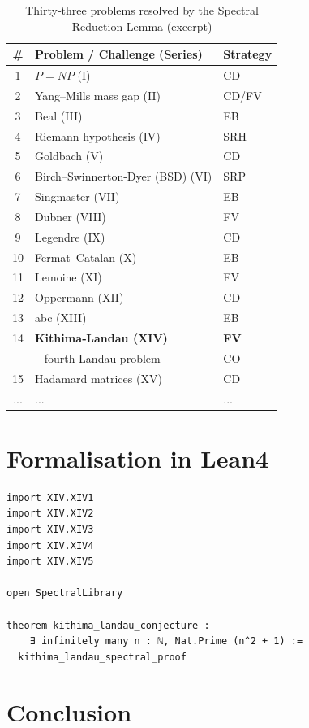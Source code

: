 \documentclass[11pt,a4paper]{article}
\begin{document}
\begin{center}
\small
\begin{longtable}{@{}cll@{}}
\caption{Thirty‑three problems resolved by the Spectral Reduction Lemma (excerpt)}\\
\toprule
\# & Problem / Challenge (Series) & Strategy \\
\midrule
1 & \(P = NP\) (I) & CD \\
2 & Yang–Mills mass gap (II) & CD/FV \\
3 & Beal (III) & EB \\
4 & Riemann hypothesis (IV) & SRH \\
5 & Goldbach (V) & CD \\
6 & Birch–Swinnerton-Dyer (BSD) (VI) & SRP \\
7 & Singmaster (VII) & EB \\
8 & Dubner (VIII) & FV \\
9 & Legendre (IX) & CD \\
10 & Fermat–Catalan (X) & EB \\
11 & Lemoine (XI) & FV \\
12 & Oppermann (XII) & CD \\
13 & abc (XIII) & EB \\
14 & \textbf{Kithima‑Landau (XIV)} & \textbf{FV} \\
    & \quad – fourth Landau problem & CO \\
15 & Hadamard matrices (XV) & CD \\
... & ... & ... \\
\bottomrule
\end{longtable}
\end{center}

\section{Formalisation in Lean4}

\begin{lstlisting}[style=lean, caption={MainXIV.lean (final)}]
import XIV.XIV1
import XIV.XIV2
import XIV.XIV3
import XIV.XIV4
import XIV.XIV5

open SpectralLibrary

theorem kithima_landau_conjecture :
    ∃ infinitely many n : ℕ, Nat.Prime (n^2 + 1) :=
  kithima_landau_spectral_proof
\end{lstlisting}

\section{Conclusion}
\end{document}
